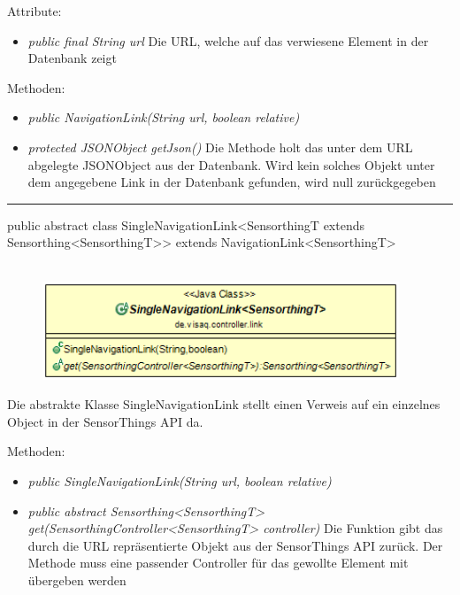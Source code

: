 Attribute:
\begin{itemize}
    \item \emph{public final String url} Die URL, welche auf das verwiesene Element in der Datenbank zeigt
\end{itemize}
Methoden:
\begin{itemize}
    \item \emph{public NavigationLink(String url, boolean relative)}
    \relativeDescription
    \item \emph{protected JSONObject getJson()} Die Methode holt das unter dem URL abgelegte JSONObject aus der Datenbank.
    Wird kein solches Objekt unter dem angegebene Link in der Datenbank gefunden, wird null zurückgegeben
\end{itemize}
\clearpage %
\rule{\textwidth}{0.4pt}
public abstract class SingleNavigationLink<SensorthingT extends Sensorthing<SensorthingT>> extends NavigationLink<SensorthingT>
\\\\
\begin{minipage}{0.55\textwidth}
    \begin{figure}[H]
        {\centering\includegraphics[width=0.95\textwidth]{media/backend/controller/classes/SingleNavigationLink.png}}
    \end{figure}
    \end{minipage} \hfill
\begin{minipage}{0.45\textwidth}
    Die abstrakte Klasse SingleNavigationLink stellt einen Verweis auf ein einzelnes Object in der \gls{SensorThings API} da.
\end{minipage}

Methoden:
\begin{itemize}
    \item \emph{public SingleNavigationLink(String url, boolean relative)}
    \relativeDescription
    \item \emph{public abstract Sensorthing<SensorthingT> get(SensorthingController<SensorthingT> controller)}
    Die Funktion gibt das durch die URL repräsentierte Objekt aus der \gls{SensorThings API} zurück.
    Der Methode muss eine passender Controller für das gewollte Element mit übergeben werden
\end{itemize}


